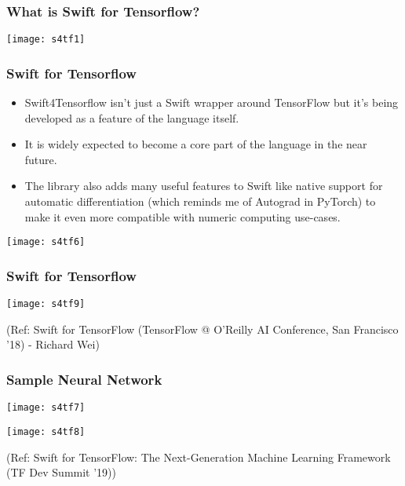 \begin{frame} \frametitle{What is Swift for Tensorflow?}
\begin{center}
\texttt{[image: s4tf1]}
\end{center}
\end{frame}

\begin{frame}[fragile] \frametitle{Swift for Tensorflow}

\begin{itemize}
\item Swift4Tensorflow isn’t just a Swift wrapper around TensorFlow but it’s being developed as a feature of the language itself. 
\item It is widely expected to become a core part of the language in the near future.
\item The library also adds many useful features to Swift like native support for automatic differentiation (which reminds me of Autograd in PyTorch) to make it even more compatible with numeric computing use-cases.
\end{itemize}

\begin{center}
\texttt{[image: s4tf6]}
\end{center}
\end{frame}

\begin{frame}[fragile] \frametitle{Swift for Tensorflow}

\begin{center}
\texttt{[image: s4tf9]}
\end{center}

{\tiny (Ref: Swift for TensorFlow (TensorFlow @ O’Reilly AI Conference, San Francisco '18) - Richard Wei)}
\end{frame}


\begin{frame}[fragile] \frametitle{Sample Neural Network}

\begin{center}
\texttt{[image: s4tf7]}

\texttt{[image: s4tf8]}
\end{center}

{\tiny (Ref: Swift for TensorFlow: The Next-Generation Machine Learning Framework (TF Dev Summit '19))}
\end{frame}

